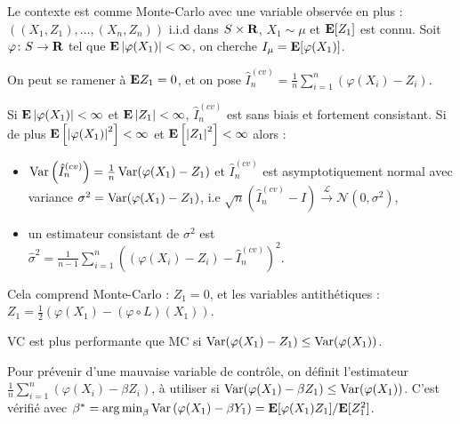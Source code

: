 \noindent Le contexte est comme Monte-Carlo avec une variable observée en plus : $((X_1,Z_1), \ldots, (X_n,Z_n))$ i.i.d dans $S \times \mathbf{R}$, $X_1 \sim \mu$ et $\mathbf{E}[Z_1]$ est connu.
Soit $\varphi \colon S \to \mathbf{R}$ tel que $\mathbf{E} \left\lvert\varphi(X_1)\right\rvert < \infty$, on cherche $I_\mu = \mathbf{E}[\varphi(X_1)]$.

On peut se ramener à $\mathbf{E} Z_1 = 0$, et on pose $\hat{I}_n^{(cv)} = \frac{1}{n} \sum_{i = 1}^n \left( \varphi(X_i) - Z_i \right)$.

\begin{pop}
	Si $\mathbf{E} \left\lvert\varphi(X_1)\right\rvert < \infty$ et $\mathbf{E} \left\lvert Z_1\right\rvert < \infty$, $\hat{I}_n^{(cv)}$ est sans biais et fortement consistant.
	Si de plus $\mathbf{E} \left[ \left\lvert\varphi(X_1)\right\rvert^2 \right] < \infty$ et $\mathbf{E} \left[ \left\lvert Z_1\right\rvert^2 \right] < \infty$ alors :
	\begin{itemize}
		\item[\textbullet] $\operatorname{Var} \left( \hat{I}_n^{(cv)} \right) = \frac{1}{n} \operatorname{Var}(\varphi(X_1) - Z_1)$ et $\hat{I}_n^{(cv)}$ est asymptotiquement normal avec variance $\sigma^2 = \operatorname{Var}(\varphi(X_1) - Z_1)$, i.e $\sqrt{n} \left( \hat{I}_n^{(cv)} - I \right) \overset{\mathcal{L}}{\longrightarrow} \mathcal{N}(0,\sigma^2)$,
		\item[\textbullet] un estimateur consistant de $\sigma^2$ est $\hat{\sigma}^2 = \frac{1}{n - 1} \sum_{i = 1}^n \left( (\varphi(X_i) - Z_i) - \hat{I}_n^{(cv)} \right)^2$.
	\end{itemize}
\end{pop}


\begin{rem}
	Cela comprend Monte-Carlo : $Z_1 = 0$, et les variables antithétiques : $Z_1 = \frac{1}{2}(\varphi(X_1) - (\varphi \circ L)(X_1))$.
\end{rem}

\begin{rem}
	VC est plus performante que MC si $\operatorname{Var}(\varphi(X_1) - Z_1) \leq \operatorname{Var}(\varphi(X_1))$.
\end{rem}

Pour prévenir d'une mauvaise variable de contrôle, on définit l'estimateur $\frac{1}{n} \sum_{i = 1}^n (\varphi(X_i) - \beta Z_i)$, à utiliser si $\operatorname{Var}(\varphi(X_1) - \beta Z_1) \leq \operatorname{Var}(\varphi(X_1))$.
C'est vérifié avec $\beta^* = \operatorname{arg\, min}_\beta \operatorname{Var} \left( \varphi(X_1) - \beta Y_1 \right) = \mathbf{E}[\varphi(X_1)Z_1]/\mathbf{E}[Z_1^2]$.

